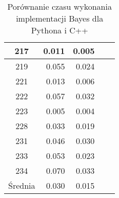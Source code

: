 \begin{table}
\begin{tabular}{|c|r|r|r|r|}
		\hline
		217 & 0.011      & 0.005      \\
		\hline
		219 & 0.055      & 0.024      \\
		\hline
		221 & 0.013      & 0.006      \\
		\hline
		222 & 0.057      & 0.032      \\
		\hline
		223 & 0.005      & 0.004      \\
		\hline
		228 & 0.033      & 0.019      \\
		\hline
		231 & 0.046      & 0.030      \\
		\hline
		233 & 0.053      & 0.023      \\
		\hline
		234 & 0.070      & 0.033      \\
		\hline
		Średnia & 0.030      & 0.015      \\
        \hline
	\end{tabular}
	\caption{Porównanie czasu wykonania implementacji Bayes dla Pythona i C++}
	\label{tab:czasy}	
\end{table}

